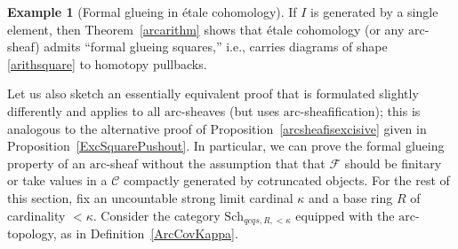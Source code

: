\documentclass[reqno]{amsart}
\newcommand{\arc}{\mathrm{arc}}
\theoremstyle{definition}
\newtheorem{example}[theorem]{Example}
\begin{document}
\begin{example}[Formal glueing in \'etale cohomology] 
\label{arithetalesquare}
If $I$ is generated by a single element, then Theorem~\ref{arcarithm} shows that \'etale cohomology
(or any $\arc$-sheaf) admits ``formal glueing squares,'' i.e., carries diagrams of
shape \eqref{arithsquare} to homotopy pullbacks. 
\end{example} 



Let us also sketch an essentially equivalent proof that is formulated slightly
differently and  applies to all $\arc$-sheaves (but uses $\arc$-sheafification);
this is analogous to the alternative proof of
Proposition~\ref{arcsheafisexcisive} given in
Proposition~\ref{ExcSquarePushout}. 
In particular, we can prove the formal glueing 
property of an $\arc$-sheaf without the assumption 
that that $\mathcal{F}$ should be finitary or take values in a $\mathcal{C}$
compactly generated by cotruncated objects. 
For the rest of this section, fix an
uncountable strong limit cardinal $\kappa$ and a base ring $R$ of cardinality
$< \kappa$. Consider the category $\mathrm{Sch}_{qcqs,R, <\kappa}$ equipped with the $\arc$-topology, as in Definition~\ref{ArcCovKappa}. 
\end{document}

